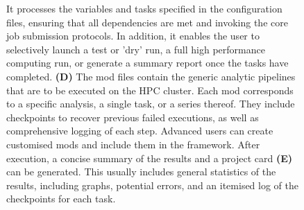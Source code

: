 \documentclass{article}
\begin{document}
\begin{figure}[ht!]
{It processes the variables and tasks specified in the configuration files, ensuring that all dependencies are met and invoking the core job submission protocols. In addition, it enables the user to selectively launch a test or 'dry' run, a full high performance computing run, or generate a summary report once the tasks have completed. {\bf (D)} The mod files contain the generic analytic pipelines that are to be executed on the HPC cluster. Each mod corresponds to a specific analysis, a single task, or a series thereof. They include checkpoints to recover previous failed executions, as well as comprehensive logging of each step. Advanced users can create customised mods and include them in the framework. After execution, a concise summary of the results and a project card {\bf(E)} can be generated. This usually includes general statistics of the results, including graphs, potential errors, and an itemised log of the checkpoints for each task.}
\label{overview}
\end{figure}
\end{document}
